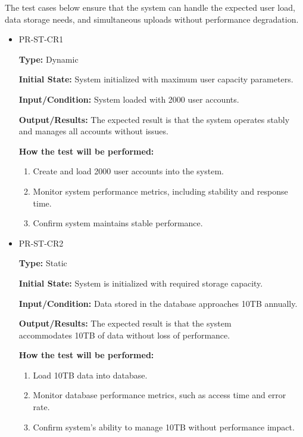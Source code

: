 \documentclass[12pt, titlepage]{article}
\begin{document}
\hspace{2em}The test cases below ensure that the system can handle the expected user load, 
data storage needs, and simultaneous uploads without performance degradation. 

\begin{itemize}
  \item PR-ST-CR1
  \begin{mdframed}[linewidth=0.5mm]
      \textbf{Type:} Dynamic \par
      \textbf{Initial State:} System initialized with maximum user capacity parameters. \par
      \textbf{Input/Condition:} System loaded with 2000 user accounts. \par
      \textbf{Output/Results:} The expected result is that the system operates stably and manages all accounts without issues. \par
      \textbf{How the test will be performed:}
      \begin{enumerate}[noitemsep]
        \item Create and load 2000 user accounts into the system.
        \item Monitor system performance metrics, including stability and response time.
        \item Confirm system maintains stable performance.
      \end{enumerate}
  \end{mdframed}
  \item PR-ST-CR2
  \begin{mdframed}[linewidth=0.5mm]
      \textbf{Type:} Static \par
      \textbf{Initial State:} System is initialized with required storage capacity. \par
      \textbf{Input/Condition:} Data stored in the database approaches 10TB annually. \par
      \textbf{Output/Results:} The expected result is that the system \\accommodates 10TB of data without loss of performance. \par
      \textbf{How the test will be performed:}
      \begin{enumerate}[noitemsep]
        \item Load 10TB data into database.
        \item Monitor database performance metrics, such as access time and error rate.
        \item Confirm system’s ability to manage 10TB without performance impact.
      \end{enumerate}
  \end{mdframed}
\end{itemize}
\end{document}
